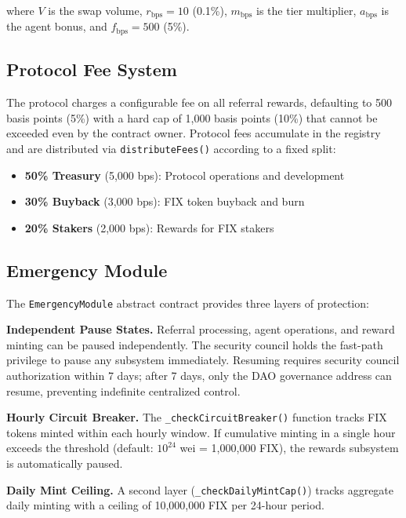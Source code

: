 \documentclass[conference]{IEEEtran}
\begin{document}
where $V$ is the swap volume, $r_{\text{bps}} = 10$ (0.1\%), $m_{\text{bps}}$ is the tier multiplier, $a_{\text{bps}}$ is the agent bonus, and $f_{\text{bps}} = 500$ (5\%).

\subsection{Protocol Fee System}
\label{sec:impl:fee}

The protocol charges a configurable fee on all referral rewards, defaulting to 500 basis points (5\%) with a hard cap of 1,000 basis points (10\%) that cannot be exceeded even by the contract owner. Protocol fees accumulate in the registry and are distributed via \texttt{distributeFees()} according to a fixed split:

\begin{itemize}
    \item \textbf{50\% Treasury} (5,000 bps): Protocol operations and development
    \item \textbf{30\% Buyback} (3,000 bps): FIX token buyback and burn
    \item \textbf{20\% Stakers} (2,000 bps): Rewards for FIX stakers
\end{itemize}

\subsection{Emergency Module}

The \texttt{EmergencyModule} abstract contract provides three layers of protection:

\textbf{Independent Pause States.} Referral processing, agent operations, and reward minting can be paused independently. The security council holds the fast-path privilege to pause any subsystem immediately. Resuming requires security council authorization within 7 days; after 7 days, only the DAO governance address can resume, preventing indefinite centralized control.

\textbf{Hourly Circuit Breaker.} The \texttt{\_checkCircuitBreaker()} function tracks FIX tokens minted within each hourly window. If cumulative minting in a single hour exceeds the threshold (default: $10^{24}$ wei = 1,000,000 FIX), the rewards subsystem is automatically paused.

\textbf{Daily Mint Ceiling.} A second layer (\texttt{\_checkDailyMintCap()}) tracks aggregate daily minting with a ceiling of 10,000,000 FIX per 24-hour period.
\end{document}
